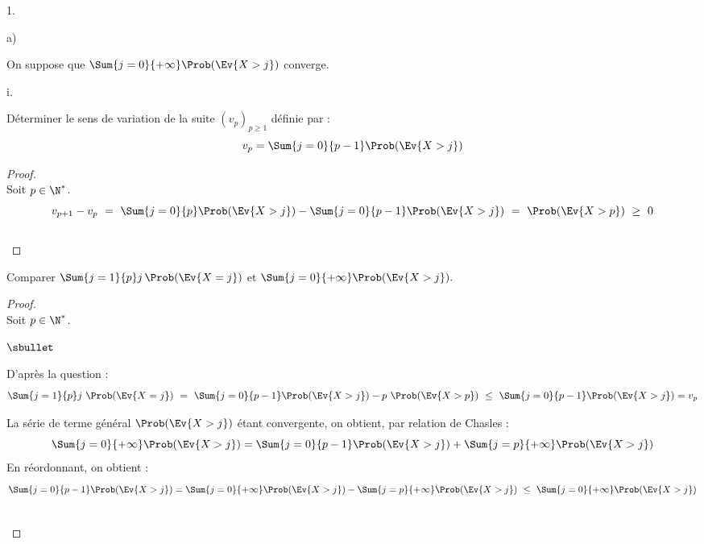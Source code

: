 \documentclass[11pt]{article}%
\begin{document}
\begin{noliste}{1.}
\begin{noliste}{a)}
  \item On suppose que $\Sum{j=0}{+\infty} \Prob(\Ev{X >j})$ converge.
    \begin{nonoliste}{i.}
    \item Déterminer le sens de variation de la suite $(v_p)_{p \geq
        1}$ définie par :
      \[
      v_p= \Sum{j=0}{p-1} \Prob(\Ev{X >j})
      \]
      
      \begin{proof}~\\%
        Soit $p \in \N^*$.
        \[
        v_{p+1} - v_p \ = \ \Sum{j = 0}{p} \Prob(\Ev{X > j}) - \Sum{j
          = 0}{p - 1} \Prob(\Ev{X > j}) \ = \ \Prob(\Ev{X > p}) \ \geq
        \ 0
        \]
        ~\\[-1.4cm]
      \end{proof}

    \item Comparer $\Sum{j=1}{p} j \, \Prob(\Ev{X =j})$ et
      $\Sum{j=0}{+\infty} \Prob(\Ev{X >j}).$
    \end{nonoliste}

      \begin{proof}~\\%
        Soit $p \in \N^*$.
        \begin{noliste}{$\sbullet$}
        \item D'après la question  :
          \[
          \Sum{j = 1}{p} j \ \Prob(\Ev{X = j}) \ = \ \Sum{j = 0}{p-1}
          \Prob(\Ev{X > j}) - p \ \Prob(\Ev{X > p}) \ \leq \ \Sum{j =
            0}{p-1} \Prob(\Ev{X > j}) = v_{p}
          \]
        \item La série de terme général $\Prob(\Ev{X > j})$ étant
          convergente, on obtient, par relation de Chasles :
          \[
          \Sum{j = 0}{+\infty} \Prob(\Ev{X > j}) = \Sum{j = 0}{p - 1}
          \Prob(\Ev{X > j}) + \Sum{j = p}{+\infty} \Prob(\Ev{X > j})
          \]
          En réordonnant, on obtient : 
          \[
          \Sum{j = 0}{p-1} \Prob(\Ev{X > j}) = \Sum{j = 0}{+\infty}
          \Prob(\Ev{X > j}) - \Sum{j = p}{+\infty} \Prob(\Ev{X > j}) \
          \leq \ \Sum{j = 0}{+\infty} \Prob(\Ev{X > j})
          \]          
        \end{noliste}
        \conc{$\Sum{j = 1}{p} j \ \Prob(\Ev{X = j}) \ \leq \ \Sum{j =
            0}{+\infty} \Prob(\Ev{X > j})$}%
        ~\\[-1.4cm]
      \end{proof}


\end{noliste}
\end{noliste}
\end{document}
